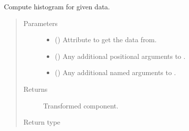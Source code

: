\documentclass[letterpaper,10pt,english]{sphinxmanual}
\begin{document}
\begin{fulllineitems}
\begin{fulllineitems}
\label{\detokenize{api/base_classes:geology.src.base_spatial.SpatialComponent.histogram}}
Compute histogram for given data.
\begin{quote}\begin{description}
\item[{Parameters}] \leavevmode\begin{itemize}
\item {} 
 (\sphinxstyleliteralemphasis{\sphinxupquote{, }}) \textendash{} Attribute to get the data from.

\item {} 
 () \textendash{} Any additional positional arguments to .

\item {} 
 () \textendash{} Any additional named arguments to .

\end{itemize}

\item[{Returns}] \leavevmode
{} \textendash{} Transformed component.

\item[{Return type}] \leavevmode
{\hyperref[\detokenize{api/base_classes:geology.src.base_spatial.SpatialComponent}]{}}

\end{description}\end{quote}

\end{fulllineitems}



\end{fulllineitems}
\end{document}
